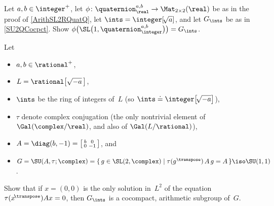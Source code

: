 \begin{exercises}

\item \label{SU2=Quat}
Let $a,b \in \integer^+$, let $\phi \colon \quaternion_\real^{a,b} \to \Mat_{2 \times 2}(\real)$ be as in the proof of \cref{ArithSL2RQuatQ}, let $\ints = \integer[\!\sqrt{a}]$, and let $G_\ints$ be as in \cref{SU2QCocpct}. 
Show  $\phi \bigl( \SL \bigl(1, \quaternion_\integer^{a,b} \bigr) \bigr) = G_\ints$. 

\item \label{CocpctSU11}
Let
	\begin{itemize}
	\item $a, b \in \rational^+$,
	\item $L = \rational \bigl[ \sqrt{-a} \,\bigr]$,
	\item $\ints$ be the ring of integers of~$L$ (so $\ints \doteq \integer\bigl[\! \sqrt{-a}\bigr]$),
	\item $\tau$ denote complex conjugation (the only nontrivial element of $\Gal(\complex/\real)$, and also of $\Gal(L/\rational)$),
	\item $A = \diag(b,-1) = \left[\begin{smallmatrix} b & 0 \\ 0 & -1 \end{smallmatrix}\right]$,
	and
	\item $G = \SU( A, \tau; \complex ) = \{\, g \in \SL(2,\complex) \mid \tau(g^\transpose) \, A \, g = A \,\} \iso \SU(1,1)$.
	\end{itemize}
Show that if $x = (0,0)$ is the only solution in~$L^2$ of the equation $\tau( x\!{}^\transpose) A  x = 0$, then $G_\ints$ is a cocompact, arithmetic subgroup of~$G$.

%
%

\end{exercises}



